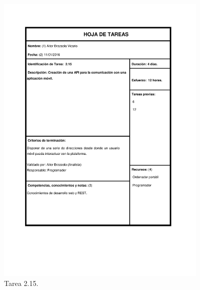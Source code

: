 \documentclass{DeustoFDP}
\begin{document}
\begin{figure}[H]
    \centering
    \includegraphics[width=0.9\textwidth]{fig/Tareas/215}
    \caption{Tarea 2.15.}
    \label{fig:t215}
\end{figure}
\end{document}
